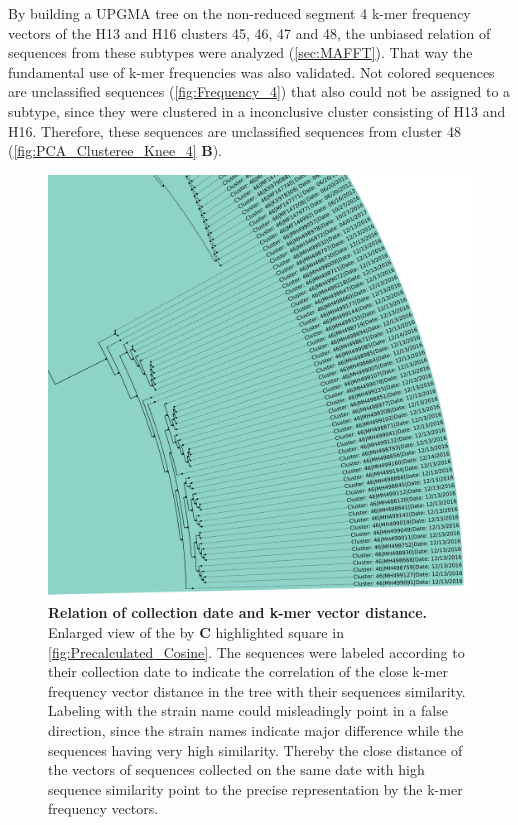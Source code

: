By building a \gls{UPGMA} tree on the non-reduced segment 4 k-mer frequency vectors of the H13 and H16 clusters 45, 46, 47 and 48, the unbiased relation of sequences from these subtypes were analyzed (\autoref{sec:MAFFT}). That way the fundamental use of k-mer frequencies was also validated. Not colored sequences are unclassified sequences (\autoref{fig:Frequency_4}) that also could not be assigned to a subtype, since they were clustered in a inconclusive cluster consisting of H13 and H16. Therefore, these sequences are unclassified sequences from cluster 48 (\autoref{fig:PCA_Clusteree_Knee_4} \textbf{\textsf{B}}).

\begin{figure}[!hbt]
    \centering
    \includegraphics[width=\textwidth]{Graphics/identical.pdf}
    \caption[Relation of collection date and k-mer vector distance]{\textbf{Relation of collection date and k-mer vector distance.} Enlarged view of the by \textbf{\textsf{C}} highlighted square in \autoref{fig:Precalculated_Cosine}. The sequences were labeled according to their collection date to indicate the correlation of the close k-mer frequency vector distance in the tree with their sequences similarity. Labeling with the strain name could misleadingly point in a false direction, since the strain names indicate major difference while the sequences having very high similarity. Thereby the close distance of the vectors of sequences collected on the same date with high sequence similarity point to the precise representation by the k-mer frequency vectors.}
    \label{fig:focus}
\end{figure}

